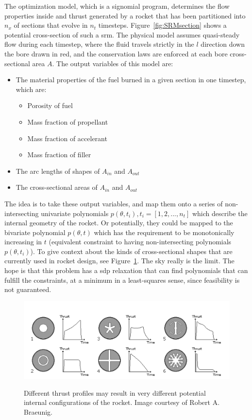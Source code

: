 \documentclass[11pt]{article}
\begin{document}
The optimization model, which is a signomial program, determines the
flow properties inside and thrust generated by a rocket that has
been partitioned into $n_x$ of sections that evolve in $n_t$ timesteps.
    Figure~\ref{fig:SRMsection} shows a potential cross-section of such a \gls{srm}.
The physical model assumes quasi-steady flow during each timestep, where the fluid travels strictly
in the $l$ direction down the bore drawn in red, and the conservation laws are enforced at
each bore cross-sectional area $A$. The output variables of this model are:
    \begin{itemize}
    \item The material properties of the fuel burned in a given section in one timestep, which are:
        \begin{itemize}
        \item Porosity of fuel
        \item Mass fraction of propellant
        \item Mass fraction of accelerant
        \item Mass fraction of filler
        \end{itemize}
    \item The arc lengths of shapes of $A_{in}$ and $A_{out}$
    \item The cross-sectional areas of $A_{in}$ and $A_{out}$
    \end{itemize}
    
The idea is to take these output variables, and map them onto a series of 
non-intersecting univariate polynomials $p(\theta, t_i), t_i = [1,2,...,n_t]$ which describe the internal geometry of the rocket. Or potentially, they could be mapped to the bivariate polynomial $p(\theta,t)$ which has the requirement to be monotonically increasing in $t$ (equivalent constraint to having non-intersecting polynomials $p(\theta, t_i)$). To give context about the kinds of cross-sectional shapes that are currently used in rocket design, see Figure~\ref{fig:potentialShapes}. The sky really is the limit. The hope is that this problem has a \gls{sdp} relaxation that can find polynomials that can fulfill the constraints, at a minimum in a least-squares sense, since feasibility is not guaranteed. 

\begin{figure}
\begin{center}
\includegraphics[width=0.7\linewidth]{figures/potentialShapes.png}
\label{fig:potentialShapes}
\caption{Different thrust profiles may result in very different potential internal configurations of the rocket. Image courtesy of Robert A. Braeunig.}
\end{center}
\end{figure}
\end{document}
